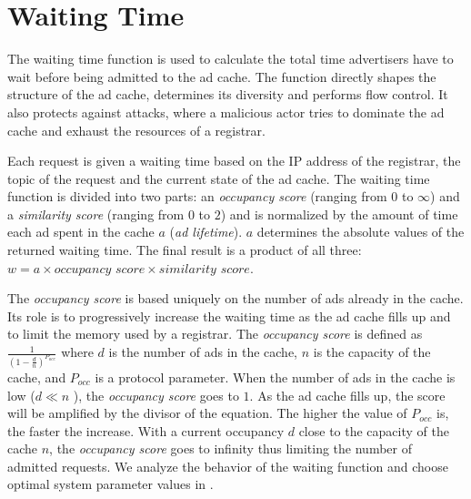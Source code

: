 
\section{Waiting Time}
\label{sec:waitingTime}

The waiting time function is used to calculate the total time advertisers have to wait before being admitted to the ad cache. 
The function directly shapes the structure of the ad cache, determines its diversity and performs flow control. 
It also protects against attacks, where a malicious actor tries to dominate the ad cache and exhaust the resources of a registrar. 

Each request is given a waiting time based on the IP address of the registrar, the topic of the request and the current state of the ad cache. 
The waiting time function is divided into two parts: an \emph{occupancy score} (ranging from $0$ to $\infty$) and a \emph{similarity score} (ranging from $0$ to $2$) and is normalized by the amount of time each ad spent in the cache $a$ (\ie \emph{ad lifetime}). $a$ determines the absolute values of the returned waiting time.  The final result is a product of all three: $w = a \times \textit{occupancy score} \times \textit{similarity score}.$

The \emph{occupancy score} is based uniquely on the number of ads already in the cache.
Its role is to progressively increase the waiting time as the ad cache fills up and to limit the memory used by a registrar.
The \emph{occupancy score} is defined as $\frac{1}{(1-\frac{d}{n})^{P_{occ}}}$
where $d$ is the number of ads in the cache, $n$ is the capacity of the cache, and $P_\textit{occ}$ is a protocol parameter. 
When the number of ads in the cache is low ($d \ll n$ ), the \emph{occupancy score} goes to $1$. 
As the ad cache fills up, the score will be amplified  by the divisor of the equation. 
The higher the value of $P_\textit{occ}$ is, the faster the increase. 
With a current occupancy $d$ close to the capacity of the cache $n$, the \emph{occupancy score} goes to infinity thus limiting the number of admitted requests. We analyze the behavior of the waiting function and choose optimal system parameter values in .


